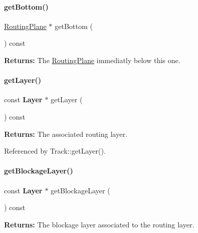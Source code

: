 \paragraph{\texorpdfstring{get\+Bottom()}{getBottom()}}
{\footnotesize\ttfamily \mbox{\hyperlink{classKite_1_1RoutingPlane}{Routing\+Plane}} $\ast$ get\+Bottom (\begin{DoxyParamCaption}{ }\end{DoxyParamCaption}) const}

{\bfseries Returns\+:} The \mbox{\hyperlink{classKite_1_1RoutingPlane}{Routing\+Plane}} immediatly below this one. \mbox{\label{classKite_1_1RoutingPlane_ab045567c4f529dca7790d66c17c3084f}} 
\paragraph{\texorpdfstring{get\+Layer()}{getLayer()}}
{\footnotesize\ttfamily const \textbf{ Layer} $\ast$ get\+Layer (\begin{DoxyParamCaption}{ }\end{DoxyParamCaption}) const\hspace{0.3cm}{\ttfamily [inline]}}

{\bfseries Returns\+:} The associated routing layer. 

Referenced by Track\+::get\+Layer().

\mbox{\label{classKite_1_1RoutingPlane_a4e47dfca4bfafa56d9c0f1dc39dc237e}} 
\paragraph{\texorpdfstring{get\+Blockage\+Layer()}{getBlockageLayer()}}
{\footnotesize\ttfamily const \textbf{ Layer} $\ast$ get\+Blockage\+Layer (\begin{DoxyParamCaption}{ }\end{DoxyParamCaption}) const\hspace{0.3cm}{\ttfamily [inline]}}

{\bfseries Returns\+:} The blockage layer associated to the routing layer. 

